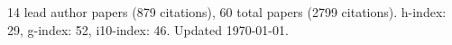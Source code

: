 14 lead author papers (879 citations),
60 total papers (2799 citations).\newline
h-index: 29, g-index: 52, i10-index: 46. Updated \today.